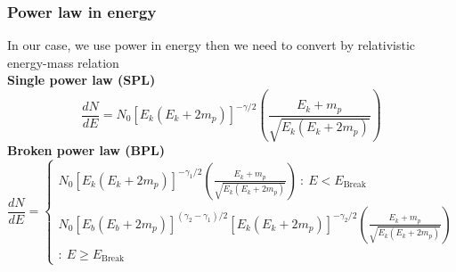 \documentclass{beamer}
\begin{document}
\begin{frame}
\frametitle{Power law in energy}
In our case, we use power in energy then we need to convert by relativistic energy-mass relation \\
\textbf{Single power law (SPL)}
\begin{equation}
\frac{dN}{dE} = N_0[E_k(E_k+2m_p)]^{-\gamma/2} \left(\frac{E_k+m_p}{\sqrt{E_k(E_k+2m_p)}}\right)
\end{equation}
\textbf{Broken power law (BPL)}
\begin{equation}
\frac{dN}{dE}=
  \begin{cases}
    N_0[E_k(E_k+2m_p)]^{-\gamma_1/2} \left(\frac{E_k+m_p}{\sqrt{E_k(E_k+2m_p)}}\right)\ :\ E < E_{\text{Break}}\\
    N_0[E_b(E_b+2m_p)]^{(\gamma_2-\gamma_1)/2}[E_k(E_k+2m_p)]^{-\gamma_2/2} \left(\frac{E_k+m_p}{\sqrt{E_k(E_k+2m_p)}}\right)\\ :\ E \ge E_{\text{Break}}
  \end{cases}
\end{equation}
\end{frame}
\end{document}
